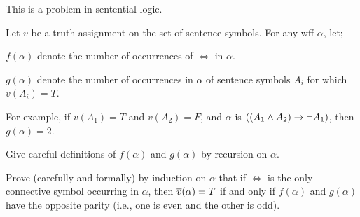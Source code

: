 \begin{problem}
This is a problem in sentential logic.

\step
Let $v$ be a truth assignment on the set of sentence symbols.
For any wff $\alpha$, let;
\begin{enumroman}
  \item $f(\alpha)$ denote the number of occurrences of
    $\iff$ in $\alpha$.
  \item $g(\alpha)$ denote the number of occurrences in $\alpha$
    of sentence symbols $A_i$ for which $v(A_i) = T$.
\end{enumroman}
For example, if $v(A_1) = T$ and $v(A_2) = F$,
and $\alpha$ is $((A_1 \land A_2) \rightarrow \lnot A_1)$,
then $g(\alpha) = 2$.
\begin{enumalph}
  \item Give careful definitions of $f(\alpha)$ and $g(\alpha)$
    by recursion on $\alpha$.
  \item Prove (carefully and formally) by induction on $\alpha$
    that if $\iff$ is the only connective symbol occurring in $\alpha$,
    then $\overline{v}(\alpha) = T$ if and only if $f(\alpha)$ and $g(\alpha)$
    have the opposite parity (i.e., one is even and the other is odd).
\end{enumalph}
\end{problem}
